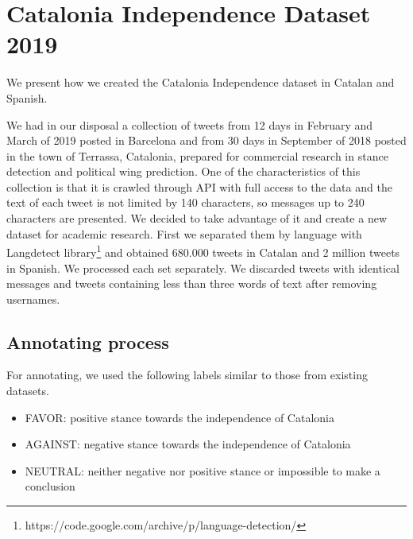 \documentclass[10pt, a4paper]{article}
\begin{document}







\section{Catalonia Independence Dataset 2019}

We present how we created the Catalonia Independence dataset in Catalan and Spanish. 

We had in our disposal a collection of tweets from 12 days in February and March of 2019 posted in Barcelona and from 30 days in September of 2018 posted in the town of Terrassa, Catalonia, prepared for commercial research in stance detection and political wing prediction. One of the characteristics of this collection is that it is crawled through API with full access to the data and the text of each tweet is not limited by 140 characters, so messages up to 240 characters are presented. We decided to take advantage of it and create a new dataset for academic research. First we separated them by language with Langdetect library\footnote{https://code.google.com/archive/p/language-detection/} and obtained 680.000 tweets in Catalan and 2 million tweets in Spanish. We processed each set separately. We discarded tweets with identical messages and tweets containing less than three words of text after removing usernames.   

\subsection{Annotating process}

For annotating, we used the following labels similar to  those from existing datasets. 
\begin{itemize}
\item FAVOR: positive stance towards the independence of Catalonia 
\item AGAINST: negative stance towards the independence of Catalonia 
\item NEUTRAL: neither negative nor positive stance or impossible to make a conclusion 
\end{itemize}
\end{document}
